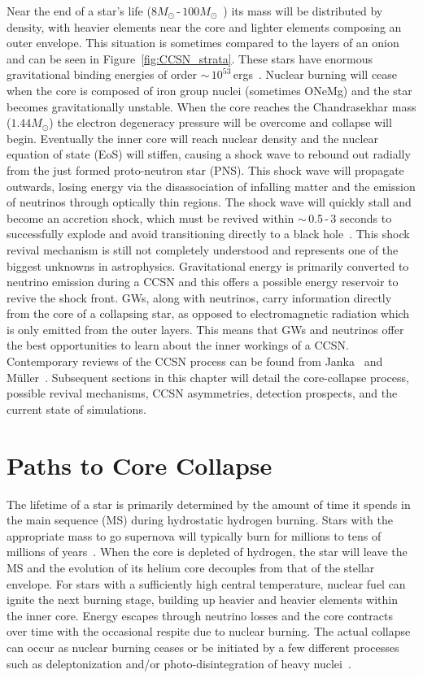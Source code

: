 Near the end of a star's life ($8M_\odot$\,-\,$100M_\odot$~\cite{thesis_jade, janka}) its mass will be distributed by density, with heavier elements near the core and lighter elements composing an outer envelope. This situation is sometimes compared to the layers of an onion and can be seen in Figure~\ref{fig:CCSN_strata}. These stars have enormous gravitational binding energies of order $\sim\,10^{53}$\,ergs~\cite{colgate1966hydrodynamic}. Nuclear burning will cease when the core is composed of iron group nuclei (sometimes ONeMg) and the star becomes gravitationally unstable. When the core reaches the Chandrasekhar mass ($1.44M_\odot$) the electron degeneracy pressure will be overcome and collapse will begin. Eventually the inner core will reach nuclear density and the nuclear equation of state (EoS) will stiffen, causing a shock wave to rebound out radially from the just formed proto-neutron star (PNS). This shock wave will propagate outwards, losing energy via the disassociation of infalling matter and the emission of neutrinos through optically thin regions. The shock wave will quickly stall and become an accretion shock, which must be revived within $\sim$\,0.5\,-\,3 seconds to successfully explode and avoid transitioning directly to a black hole~\cite{thesis_jade}. This shock revival mechanism is still not completely understood and represents one of the biggest unknowns in astrophysics. Gravitational energy is primarily converted to neutrino emission during a CCSN and this offers a possible energy reservoir to revive the shock front. GWs, along with neutrinos, carry information directly from the core of a collapsing star, as opposed to electromagnetic radiation which is only emitted from the outer layers. This means that GWs and neutrinos offer the best opportunities to learn about the inner workings of a CCSN. Contemporary reviews of the CCSN process can be found from Janka~\cite{janka} and M\"uller~\cite{muller2016core}. Subsequent sections in this chapter will detail the core-collapse process, possible revival mechanisms, CCSN asymmetries, detection prospects, and the current state of simulations.

\section{Paths to Core Collapse}

The lifetime of a star is primarily determined by the amount of time it spends in the main sequence (MS) during hydrostatic hydrogen burning. Stars with the appropriate mass to go supernova will typically burn for millions to tens of millions of years~\cite{janka}. When the core is depleted of hydrogen, the star will leave the MS and the evolution of its helium core decouples from that of the stellar envelope. For stars with a sufficiently high central temperature, nuclear fuel can ignite the next burning stage, building up heavier and heavier elements within the inner core. Energy escapes through neutrino losses and the core contracts over time with the occasional respite due to nuclear burning. The actual collapse can occur as nuclear burning ceases or be initiated by a few different processes such as deleptonization and/or photo-disintegration of heavy nuclei~\cite{muller2016core}.

